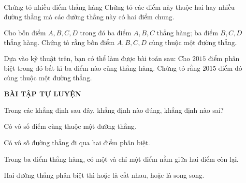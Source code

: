 \begin{dang}{Chứng tỏ nhiều điểm thẳng hàng}
Chứng tỏ các điểm này thuộc hai hay nhiều đường thẳng mà các đường thẳng này có hai điểm chung.
\end{dang}
\begin{vd}
	Cho bốn điểm $ A, B, C, D $ trong đó ba điểm $ A, B, C $ thẳng hàng; ba điểm $ B, C, D $ thẳng hàng. Chứng tỏ rằng bốn điểm $ A, B, C, D $ cùng thuộc một đường thẳng.
\end{vd}
\begin{note}
	Dựa vào kỹ thuật trên, bạn có thể làm được bài toán sau: Cho $ 2015 $ điểm phân biệt trong đó bất kì ba điểm nào cũng thẳng hàng. Chứng tỏ rằng $ 2015 $  điểm đó cùng thuộc một đường thẳng.
\end{note}


\begin{center}
\textbf{BÀI TẬP TỰ LUYỆN}
\end{center}

\begin{bt}%
Trong các khẳng định sau đây, khẳng định nào đúng, khẳng định nào sai?
\begin{enumEX}{1}
	\item Có vô số điểm cùng thuộc một đường thẳng.
	\item Có vô số đường thẳng đi qua hai điểm phân biệt.
	\item Trong ba điểm thẳng hàng, có một và chỉ một điểm nằm giữa hai điểm còn lại.
	\item Hai đường thẳng phân biệt thì hoặc là cắt nhau, hoặc là song song.
\end{enumEX}
\end{bt}

